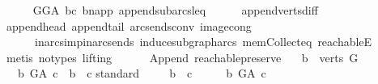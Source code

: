 \begin{isabellebody}
\ \ \ \ \isamarkupfalse%
\ GG{\isacharunderscore}{\kern0pt}A\ bc\ b{\isacharunderscore}{\kern0pt}napp\ append{\isacharunderscore}{\kern0pt}subarcs{\isacharunderscore}{\kern0pt}leq\isanewline
\ \ \ \ \isamarkupfalse%
\ append{\isacharunderscore}{\kern0pt}verts{\isacharunderscore}{\kern0pt}diff\ \isanewline
\ \ \ \ \isamarkupfalse%
\ append{\isacharunderscore}{\kern0pt}head{\isacharprime}{\kern0pt}\ append{\isacharunderscore}{\kern0pt}tail{\isacharprime}{\kern0pt}\ arcs{\isacharunderscore}{\kern0pt}ends{\isacharunderscore}{\kern0pt}conv\ image{\isacharunderscore}{\kern0pt}cong\ \isanewline
\ \ \ \ \ \ in{\isacharunderscore}{\kern0pt}arcs{\isacharunderscore}{\kern0pt}imp{\isacharunderscore}{\kern0pt}in{\isacharunderscore}{\kern0pt}arcs{\isacharunderscore}{\kern0pt}ends\ induce{\isacharunderscore}{\kern0pt}subgraph{\isacharunderscore}{\kern0pt}arcs\ mem{\isacharunderscore}{\kern0pt}Collect{\isacharunderscore}{\kern0pt}eq\ reachableE\isanewline
\ \ \ \ \isamarkupfalse%
\ {\isacharparenleft}{\kern0pt}metis\ {\isacharparenleft}{\kern0pt}no{\isacharunderscore}{\kern0pt}types{\isacharcomma}{\kern0pt}\ lifting{\isacharparenright}{\kern0pt}{\isacharparenright}{\kern0pt}\ \ \ \ \isanewline
{}\isamarkupfalse%
%
\endisatagproof
{\isafoldproof}%
%
\isadelimproof
\isanewline
%
\endisadelimproof
\isanewline
\isanewline
{}\isamarkupfalse%
\ {\isacharparenleft}{\kern0pt}\ Append{\isacharparenright}{\kern0pt}\ reachable{}{\isacharunderscore}{\kern0pt}preserve{\isacharcolon}{\kern0pt}\isanewline
\ \ \ {\isachardoublequoteopen}b\ {\isasymin}\ verts\ G{\isachardoublequoteclose}\isanewline
\ \ \ {\isachardoublequoteopen}{\isacharparenleft}{\kern0pt}b\ {\isasymrightarrow}\isactrlsup {\isacharplus}{\kern0pt}\isactrlbsub G{\isacharunderscore}{\kern0pt}A\isactrlesub \ c{\isacharparenright}{\kern0pt}\ {\isasymlongleftrightarrow}\ b\ {\isasymrightarrow}\isactrlsup {\isacharplus}{\kern0pt}\ c{\isachardoublequoteclose}\isanewline
%
\isadelimproof
%
\endisadelimproof
%
\isatagproof
{}\isamarkupfalse%
{\isacharparenleft}{\kern0pt}standard{\isacharparenright}{\kern0pt}\isanewline
\ \ \isamarkupfalse%
\ \ {\isachardoublequoteopen}b\ {\isasymrightarrow}\isactrlsup {\isacharplus}{\kern0pt}\ c{\isachardoublequoteclose}\isanewline
\ \ \isamarkupfalse%
\ \isamarkupfalse%
\ {\isachardoublequoteopen}b\ {\isasymrightarrow}\isactrlsup {\isacharplus}{\kern0pt}\isactrlbsub G{\isacharunderscore}{\kern0pt}A\isactrlesub \ c{\isachardoublequoteclose}\isanewline

\end{isabellebody}
